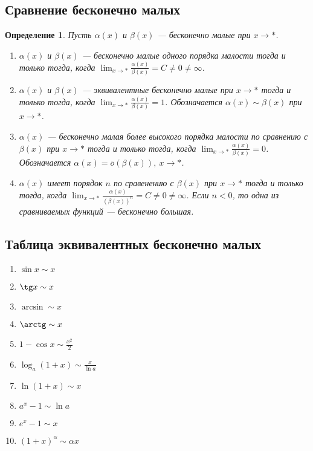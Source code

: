 \documentclass[a4paper,12pt]{article} %
\newtheorem{definition}{Определение}[section]
\theoremstyle{remark}
\theoremstyle{definition}
\begin{document}
\subsection{Сравнение бесконечно малых}
\begin{definition}
	Пусть $\alpha(x)$ и $\beta(x)$ --- бесконечно малые при $x\to *$.
	\begin{enumerate}
		\item $\alpha(x)$ и $\beta(x)$ --- бесконечно малые одного порядка малости тогда и только тогда, когда
            $\displaystyle \lim_{x \to *} \frac{\alpha(x)}{\beta(x)} = C\neq 0\neq \infty$.
        \item $\alpha(x)$ и $\beta(x)$ --- эквивалентные бесконечно малые при $x\to *$ тогда и только тогда, когда
            $\displaystyle \lim_{x \to *} \frac{\alpha(x)}{\beta(x)} = 1$. Обозначается $\alpha(x) \sim \beta(x)$ при
            $x\to *$.
		\item $\alpha(x)$ --- бесконечно малая более высокого порядка малости по сравнению с $\beta(x)$ при $x\to *$ 
            тогда и только тогда, когда $\displaystyle \lim_{x \to *} \frac{\alpha(x)}{\beta(x)} = 0$.
            Обозначается $\alpha(x) = \overline{o}(\beta(x)), \ x \to *$.
        \item $\alpha(x)$ имеет порядок $n$ по сравенению с $\beta(x)$ при $x\to *$ тогда и только тогда, когда
            $\displaystyle \lim_{x \to *} \frac{\alpha(x)}{(\beta(x))^{n}} = C \neq 0 \neq \infty$.
            Если $n<0$, то одна из сравниваемых функций --- бесконечно большая.
	\end{enumerate}
\end{definition}

\subsection{Таблица эквивалентных бесконечно малых}
\begin{enumerate}
	\item $\sin x \sim x$
	\item $\tg x \sim x$
	\item $\arcsin \sim x$
	\item $\arctg \sim x$
	\item $1 - \cos x \sim \frac{x^2}{2}$
	\item $\log_a(1+x) \sim \frac{x}{\ln a}$
	\item $\ln(1+x) \sim x$
	\item $a^{x} - 1 \sim \ln a$
	\item $e^{x} - 1 \sim x$
	\item $(1+x)^{\alpha} \sim \alpha x$
\end{enumerate}
\end{document}
